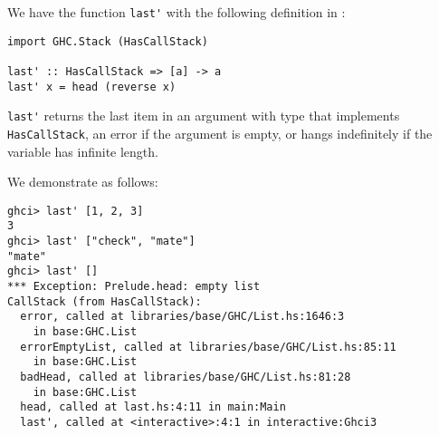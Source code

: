 
We have the function \verb|last'| with the following definition in 
:
\scriptsize\begin{verbatim}
import GHC.Stack (HasCallStack)

last' :: HasCallStack => [a] -> a 
last' x = head (reverse x)
\end{verbatim}\normalsize
\verb|last'| returns the last item in an argument with type that implements 
\verb|HasCallStack|, an error if the argument is empty, or hangs indefinitely
if the variable has infinite length.\par
\qquad We demonstrate as follows:
\scriptsize\begin{verbatim}
ghci> last' [1, 2, 3]
3
ghci> last' ["check", "mate"]
"mate"
ghci> last' []
*** Exception: Prelude.head: empty list
CallStack (from HasCallStack):
  error, called at libraries/base/GHC/List.hs:1646:3 
    in base:GHC.List
  errorEmptyList, called at libraries/base/GHC/List.hs:85:11 
    in base:GHC.List
  badHead, called at libraries/base/GHC/List.hs:81:28 
    in base:GHC.List
  head, called at last.hs:4:11 in main:Main
  last', called at <interactive>:4:1 in interactive:Ghci3
\end{verbatim}\normalsize
